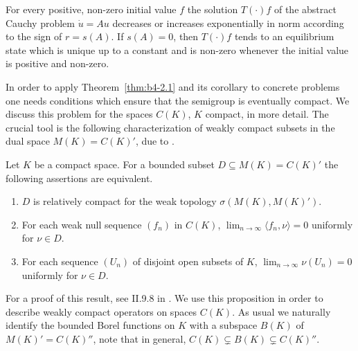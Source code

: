 For every positive, non-zero initial value $f$ the solution $T(\cdot)f$
of the abstract Cauchy problem $\dot{u} = Au$ decreases or increases
exponentially in norm according to the sign of\/ $r = s(A)$.
If\/ $s(A) = 0$, then $T(\cdot)f$ tends to an equilibrium state which is
unique up to a constant and is non-zero whenever the initial value is
positive and non-zero.

In order to apply Theorem~\ref{thm:b4-2.1} and its corollary to concrete problems one
needs conditions which ensure that the semigroup is eventually compact.
We discuss this problem for the spaces $C(K)$, $K$ compact, in
more detail.
The crucial tool is the following characterization of
weakly compact subsets in the dual space $M(K) = C(K)'$, due to
\textcite{grothendieck:1953}.
\begin{proposition}\label{prop:b4-2.3}
	Let $K$ be a compact space.
	For a bounded subset $D \subseteq M(K) = C(K)'$ the following assertions are equivalent.
	
	\begin{enumerate}[\upshape (a)]
		\item 
		$D$ is relatively compact for the weak topology $\sigma(M(K),M(K)')$.
	
		\item 
		For each weak null sequence $(f_n)$ in $C(K)$, $\lim_{n\to\infty}\langle f_n,\nu \rangle = 0$ uniformly for $\nu \in D$.
	
		\item 
		For each sequence $(U_n)$ of disjoint open subsets of\/ $K$, 
		$\lim_{n\to\infty}\nu(U_n) = 0$ uniformly for $\nu \in D$.
		\end{enumerate}
\end{proposition}
For a proof of this result, see \eg II.9.8 in \textcite{schaefer:1974}.
We use this proposition in order to describe weakly compact operators on spaces $C(K)$.
As usual we naturally identify the bounded Borel functions on $K$ with a subspace $B(K)$ of\/ $M(K)' = C(K)''$, note that in
general, $C(K) \subsetneq B(K) \subsetneq C(K)''$.
